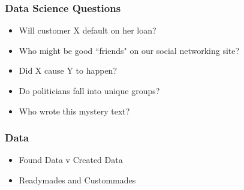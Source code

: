 \documentclass{beamer}
\begin{document}
\begin{frame}
	\frametitle{Data Science Questions}
	
\begin{itemize}
	\item Will customer X default on her loan? \pause
	

	\item Who might be good ``friends" on our social networking site? \pause
	\item Did X cause Y to happen? \pause 

\item 	Do politicians fall into unique groups? \pause 


\item 	Who wrote this mystery text?
	
\end{itemize}
\end{frame}	



\begin{frame}
	\frametitle{Data}
	
	\begin{itemize}
		\item Found Data v Created Data \pause
		\item Readymades and Custommades
		

		
	\end{itemize}
\end{frame}	
\end{document}
